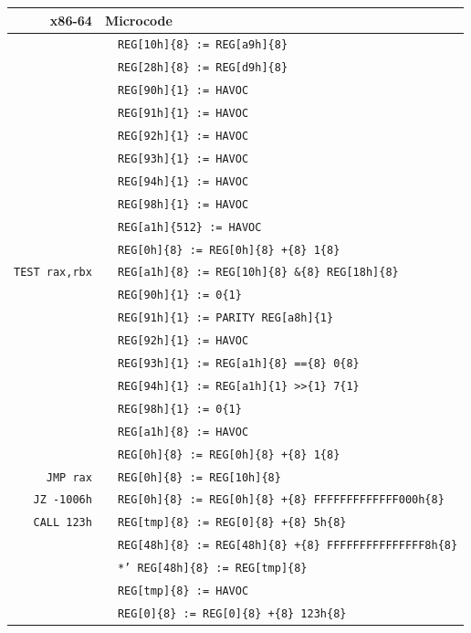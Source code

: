 \documentclass[10pt,twocolumn]{article}
\begin{document}
\begin{table}[!h]
\begin{center}
\begin{tabular}{r|rl}
\textbf{x86-64} & \multicolumn{2}{l}{\textbf{Microcode}}
\\ \hline

& & \texttt{REG[10h]\{8\} := REG[a9h]\{8\}} \\ & %
& \texttt{REG[28h]\{8\} := REG[d9h]\{8\}}  \\ & \textbf{}%
& \texttt{REG[90h]\{1\} := HAVOC} \\ & %
& \texttt{REG[91h]\{1\} := HAVOC} \\ & %
& \texttt{REG[92h]\{1\} := HAVOC} \\ & %
& \texttt{REG[93h]\{1\} := HAVOC} \\ & %
& \texttt{REG[94h]\{1\} := HAVOC} \\ & %
& \texttt{REG[98h]\{1\} := HAVOC} \\ & %
& \texttt{REG[a1h]\{512\} := HAVOC} \\ & %
& \texttt{REG[0h]\{8\} := REG[0h]\{8\} +\{8\} 1\{8\}} \\ \hline

\texttt{TEST rax,rbx} & %
& \texttt{REG[a1h]\{8\} := REG[10h]\{8\} \&\{8\} REG[18h]\{8\}} \\ & %
& \texttt{REG[90h]\{1\} := 0\{1\}} \\ & %
& \texttt{REG[91h]\{1\} := PARITY REG[a8h]\{1\}} \\ & %
& \texttt{REG[92h]\{1\} := HAVOC} \\ & %
& \texttt{REG[93h]\{1\} := REG[a1h]\{8\} ==\{8\} 0\{8\}} \\ & %
& \texttt{REG[94h]\{1\} := REG[a1h]\{1\} >>\{1\} 7\{1\}} \\ & %
& \texttt{REG[98h]\{1\} := 0\{1\}} \\ & %
& \texttt{REG[a1h]\{8\} := HAVOC} \\ & %
& \texttt{REG[0h]\{8\} := REG[0h]\{8\} +\{8\} 1\{8\}} \\ \hline

\texttt{JMP rax} & %
& \texttt{REG[0h]\{8\} := REG[10h]\{8\}} \\ \hline

\texttt{JZ -1006h} & %
& \texttt{REG[0h]\{8\} := REG[0h]\{8\} +\{8\} FFFFFFFFFFFFF000h\{8\}} \\ \hline

\texttt{CALL 123h} & %
& \texttt{REG[tmp]\{8\} := REG[0]\{8\} +\{8\} 5h\{8\}} \\ & %
& \texttt{REG[48h]\{8\} := REG[48h]\{8\} +\{8\} FFFFFFFFFFFFFFF8h\{8\}} \\ & %
& \texttt{*' REG[48h]\{8\} := REG[tmp]\{8\}} \\ & %
& \texttt{REG[tmp]\{8\} := HAVOC} \\ & %
& \texttt{REG[0]\{8\} := REG[0]\{8\} +\{8\} 123h\{8\}} \\ \hline


\end{tabular}
\end{center}
\end{table}
\end{document}
